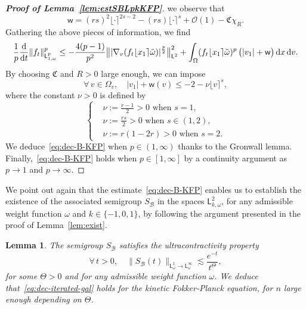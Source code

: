 \documentclass[11pt]{amsart}
\newtheorem{lemma}[theorem]{Lemma}
\theoremstyle{definition}
\theoremstyle{remark}
\numberwithin{equation}{section}
\def\BB{{\mathcal B}}
\def\OO{{\mathcal O}}
\newcommand{\dd}{{\, \mathrm d}}
\newcommand{\dt}{\frac{{\rm d}}{{\rm d}t}}
\newcommand{\sfL}{\mathsf{L}}
\newcommand{\wangle}[1]{\lfloor #1 \rceil}
\begin{document}
\begin{proof}[{\bf Proof of Lemma~\ref{lem:estSBLpkKFP}}]
  we observe that
  \begin{equation*}
    \mathsf w =  (rs)^2 \wangle{\cdot}^{2s-2} - (rs) \wangle{\cdot}^s + \OO(1) - \mathfrak{C} \chi_R.
  \end{equation*}
  Gathering the above pieces of information, we find
  \begin{equation}
    \label{eq:dec-B-KFP-ODE}
    \frac{1}{p}\dt \| f_t \|_{\sfL^{p}_{1,\omega}}^p
    \le - \frac{4(p-1)}{p^2} \big\| \vert \nabla_v (f_t\wangle{x_1} \tilde \omega) \vert^{\frac{p}{2}} \big\|_{\sfL^{2}} ^{2} + \int_\Omega  (f_t\wangle{x_1} \tilde \omega)^p \, \big( |v_1|  + \mathsf w \big) \dd x \dd v.
  \end{equation}
  By choosing $\mathfrak{C}$ and $R > 0$ large enough, we can impose
  \begin{equation*}
    \forall \, v \in \Omega_v, \quad |v_1|  + \mathsf w(v) \le -2 - \nu \wangle{v}^{s},
  \end{equation*}
  where the constant $\nu >0$ is defined by
  \begin{equation*}
    \begin{cases}
      & \nu := \frac{r-1}{2}> 0 \text{ when } s=1, \\[2mm]
      & \nu := \frac{rs}{2} > 0 \text{ when } s \in (1,2), \\[2mm]
      & \nu := r(1-2r) > 0 \text{ when } s=2.
    \end{cases}
  \end{equation*}
  We deduce~\eqref{eq:dec-B-KFP} when $p \in (1,\infty)$ thanks to the Gronwall lemma. Finally,~\eqref{eq:dec-B-KFP} holds when $p \in [1,\infty]$ by a continuity argument as $p \to 1$ and $p\to\infty$.
\end{proof}

We point out again that the estimate~\eqref{eq:dec-B-KFP} enables us to establish the existence of the associated semigroup $S_\BB$ in the spaces $\sfL^2_{k,\omega}$, for any admissible weight function $\omega$ and $k \in \{-1,0,1\}$, by following the argument presented in the proof of Lemma~\ref{lem:exist}.


\begin{lemma}
  \label{lem:estSBL1LinftyKFP}
  The semigroup $S_{\mathcal B}$ satisfies the ultracontractivity property
  \begin{equation}
    \label{eq:dec-U-KFP}
    \forall \, t >0,\quad \big\| S_\BB (t) \big\|_{\sfL^{1}_{\omega} \to \sfL^{\infty}_{\omega}}  
    \lesssim \frac{e^{-t}}{t^\Theta},
  \end{equation}
  for some $\Theta >0$ and for any admissible weight function $\omega$. We deduce that~\eqref{eq:dec-iterated-gal} holds for the kinetic Fokker-Planck equation, for $n$ large enough depending on $\Theta$.
\end{lemma}
\end{document}
